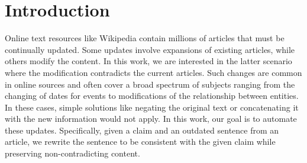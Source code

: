 \documentclass[letterpaper]{article} %
\begin{document}
\begin{abstract}



\end{abstract}
\section{Introduction}
\label{sec:introduction}
Online text resources like Wikipedia contain millions of articles that must be continually updated. Some updates involve expansions of existing articles, while others modify the content. In this work, we are interested in the latter scenario where the modification contradicts the current articles. Such changes are common in online sources and often cover a broad spectrum of subjects ranging from the changing of dates for events to modifications of the relationship between entities. In these cases, simple solutions like negating the original text or concatenating it with the new information would not apply. In this work, our goal is to automate these updates. Specifically, given a claim and an outdated sentence from an article, we rewrite the sentence to be consistent with the given claim while preserving non-contradicting content.
\end{document}
